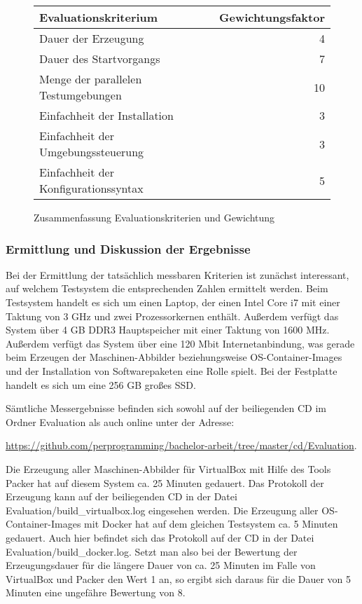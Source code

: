 \begin{figure}[!ht]
  \begin{center}
    \resizebox{15cm}{!} {
      \begin{tabular}{|l|r|}
      \hline
      Evaluationskriterium & Gewichtungsfaktor \\
      \hline
      Dauer der Erzeugung & 4 \\
      \hline
      Dauer des Startvorgangs & 7 \\
      \hline
      Menge der parallelen Testumgebungen & 10 \\
      \hline
      Einfachheit der Installation & 3 \\
      \hline
      Einfachheit der Umgebungssteuerung & 3 \\      
      \hline
      Einfachheit der Konfigurationssyntax & 5 \\
      \hline
      \end{tabular}
    }
    \caption{Zusammenfassung Evaluationskriterien und Gewichtung}
    \label{kriterien}
  \end{center}
\end{figure}

\subsubsection{Ermittlung und Diskussion der Ergebnisse}

Bei der Ermittlung der tatsächlich messbaren Kriterien ist zunächst interessant, auf welchem Testsystem die entsprechenden Zahlen ermittelt werden. Beim Testsystem handelt es sich um einen Laptop, der einen Intel Core i7 mit einer Taktung von 3 GHz und zwei Prozessorkernen enthält. Außerdem verfügt das System über 4 GB DDR3 Hauptspeicher mit einer Taktung von 1600 MHz. Außerdem verfügt das System über eine 120 Mbit Internetanbindung, was gerade beim Erzeugen der Maschinen-Abbilder beziehungsweise OS-Container-Images und der Installation von Softwarepaketen eine Rolle spielt. Bei der Festplatte handelt es sich um eine 256 GB großes \ac{SSD}.

Sämtliche Messergebnisse befinden sich sowohl auf der beiliegenden CD im Ordner Evaluation als auch online unter der Adresse:

\href{https://github.com/perprogramming/bachelor-arbeit/tree/master/cd/Evaluation}{https://github.com/perprogramming/bachelor-arbeit/tree/master/cd/Evaluation}.

Die Erzeugung aller Maschinen-Abbilder für VirtualBox mit Hilfe des Tools Packer hat auf diesem System ca. 25 Minuten gedauert. Das Protokoll der Erzeugung kann auf der beiliegenden CD in der Datei Evaluation/build\_virtualbox.log eingesehen werden. Die Erzeugung aller OS-Container-Images mit Docker hat auf dem gleichen Testsystem ca. 5 Minuten gedauert. Auch hier befindet sich das Protokoll auf der CD in der Datei Evaluation/build\_docker.log. Setzt man also bei der Bewertung der Erzeugungsdauer für die längere Dauer von ca. 25 Minuten im Falle von VirtualBox und Packer den Wert 1 an, so ergibt sich daraus für die Dauer von 5 Minuten eine ungefähre Bewertung von 8.

